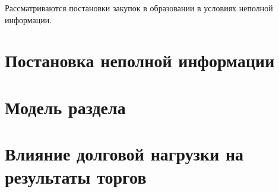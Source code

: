 Рассматриваются постановки закупок в образовании в условиях неполной информации.

\section{Постановка неполной информации}


\section{Модель раздела}



\section{Влияние долговой нагрузки на результаты торгов}


